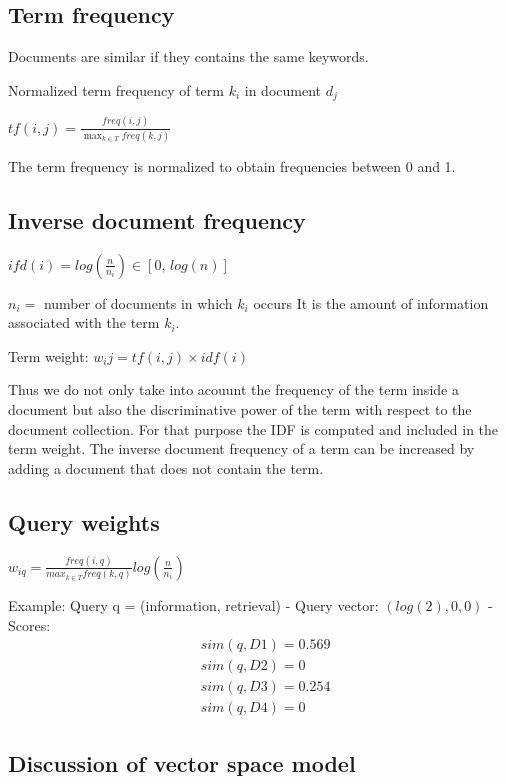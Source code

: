 \subsection{Term frequency}
Documents are similar if they contains the same keywords.

Normalized term frequency of term $ k_i $ in document $ d_j $

$ tf(i, j) = \frac{freq(i, j)}{\max_{k \in T} freq(k, j)} $

The term frequency is normalized to obtain frequencies between 0 and
1.

\subsection{Inverse document frequency}

$ ifd(i) = log(\frac{n}{n_i}) \in [0, \, log(n)] $

$ n_i =  $ number of documents in which $ k_i $ occurs
It is the amount of information associated with the term $ k_i $.

Term weight: $ w_ij = tf(i, j) \times idf(i) $

Thus we do not only take into acouunt the frequency of the term inside
a document but also the discriminative power of the term with respect
to the document collection. For that purpose the IDF is computed and
included in the term weight. The inverse document frequency of a term
can be increased by adding a document that does not contain the term.

\subsection{Query weights}

$ w_{iq} = \frac{freq(i, q)}{max_{k \in T} freq(k, q)}
log(\frac{n}{n_i})$

Example: Query q = (information, retrieval)
- Query vector: $ (log(2), 0, 0) $
- Scores:
\begin{align*}
  &sim(q, D1) = 0.569 \\
  &sim(q, D2) = 0 \\
  &sim(q, D3) = 0.254 \\
  &sim(q, D4) = 0
\end{align*}

\subsection{Discussion of vector space model}

